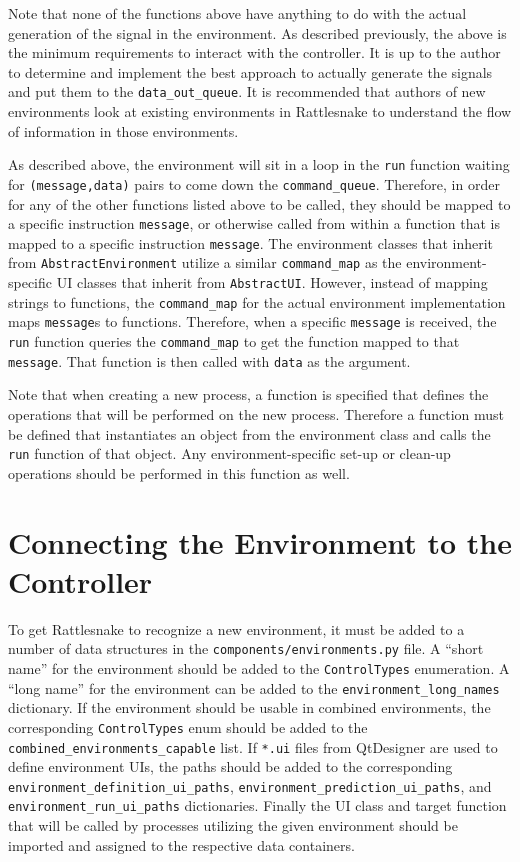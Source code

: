 \documentclass[pdf,12pt,report]{SANDreport}
\newcommand{\inlineCode}{\lstinline[basicstyle=\bfseries\ttfamily]}
\begin{document}
    Note that none of the functions above have anything to do with the actual generation of the signal in the environment.  As described previously, the above is the minimum requirements to interact with the controller.  It is up to the author to determine and implement the best approach to actually generate the signals and put them to the \inlineCode{data_out_queue}.  It is recommended that authors of new environments look at existing environments in Rattlesnake to understand the flow of information in those environments.
    
    As described above, the environment will sit in a loop in the \inlineCode{run} function waiting for \inlineCode{(message,data)} pairs to come down the \inlineCode{command_queue}.  Therefore, in order for any of the other functions listed above to be called, they should be mapped to a specific instruction \inlineCode{message}, or otherwise called from within a function that is mapped to a specific instruction \inlineCode{message}.  The environment classes that inherit from \inlineCode{AbstractEnvironment} utilize a similar \inlineCode{command_map} as the environment-specific \ac{UI} classes that inherit from \inlineCode{AbstractUI}.  However, instead of mapping strings to functions, the \inlineCode{command_map} for the actual environment implementation maps \inlineCode{message}s to functions.  Therefore, when a specific \inlineCode{message} is received, the \inlineCode{run} function queries the \inlineCode{command_map} to get the function mapped to that \inlineCode{message}.  That function is then called with \inlineCode{data} as the argument.
    
    Note that when creating a new process, a function is specified that defines the operations that will be performed on the new process.  Therefore a function must be defined that instantiates an object from the environment class and calls the \inlineCode{run} function of that object.  Any environment-specific set-up or clean-up operations should be performed in this function as well.
    
    \section{Connecting the Environment to the Controller}
    To get Rattlesnake to recognize a new environment, it must be added to a number of data structures in the \inlineCode{components/environments.py} file.  A ``short name'' for the environment should be added to the \inlineCode{ControlTypes} enumeration.  A ``long name'' for the environment can be added to the \inlineCode{environment_long_names} dictionary.  If the environment should be usable in combined environments, the corresponding \inlineCode{ControlTypes} enum should be added to the \inlineCode{combined_environments_capable} list.  If \inlineCode{*.ui} files from QtDesigner are used to define environment \ac{UI}s, the paths should be added to the corresponding \inlineCode{environment_definition_ui_paths}, \inlineCode{environment_prediction_ui_paths}, and \inlineCode{environment_run_ui_paths} dictionaries.  Finally the \ac{UI} class and target function that will be called by processes utilizing the given environment should be imported and assigned to the respective data containers.
\end{document}
